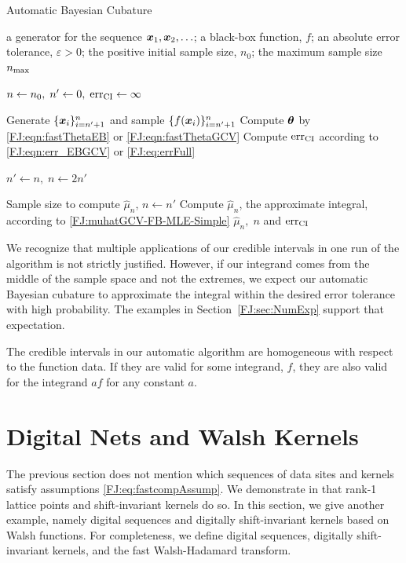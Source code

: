 \documentclass[graybox,footinfo]{svmult}
\begin{document}
\begin{algorithm}
	\caption{Automatic Bayesian Cubature}\label{FJ:algorithm1}
	\begin{algorithmic}[1]
		\Require a generator for the sequence
		${\boldsymbol{x}}_1, {\boldsymbol{x}}_2, \ldots$; 
		a black-box function, $f$; 
		an absolute error tolerance,
		$\varepsilon>0$; the positive initial sample size, $n_0$;
		the maximum sample size $n_{\textup{max}}$
		
		\State $n \gets n_0, \; n' \gets 0, \; \textup{err}_\textup{CI} \gets \infty$
		
		\State Generate $\{ {\boldsymbol{x}}_i\}_{i=n' + 1}^{n}$ and sample $\{f({\boldsymbol{x}}_i)\}_{i=n'+1}^{n}$
		\State Compute ${\boldsymbol{\theta}}$ by \eqref{FJ:eqn:fastThetaEB} or \eqref{FJ:eqn:fastThetaGCV}
		\State Compute $\textup{err}_\textup{CI}$  according to \eqref{FJ:eqn:err_EBGCV} or \eqref{FJ:eq:errFull}
		
		\State	$n' \gets n, \; n \gets 2n'$
		
		\EndWhile
		
		\State Sample size to compute $\widehat{\mu}_n$, $n \gets n'$
		\State Compute $\widehat{\mu}_n$, the approximate integral, according to \eqref{FJ:muhatGCV-FB-MLE-Simple}
		\State \Return $\widehat{\mu}_n, \; n$  and $\textup{err}_\textup{CI}$
	\end{algorithmic}
\end{algorithm}

We recognize that multiple applications of our credible intervals in one run of the algorithm is not strictly justified.  However, if our integrand comes from the middle of the sample space  and not the extremes, we expect our automatic Bayesian cubature to approximate the integral within the desired error tolerance with high probability. The examples in Section~\ref{FJ:sec:NumExp} support that expectation. 

The credible intervals in our automatic algorithm are homogeneous with respect to the function data.  If they are valid for some integrand, $f$, they are also valid for the integrand $a f$ for any constant $a$.  





\section{Digital Nets and Walsh Kernels}
\label{FJ:sec:sobol_walsh}


The previous section does not mention which sequences of data sites and  kernels satisfy assumptions \eqref{FJ:eq:fastcompAssump}.  We demonstrate in \cite{RatHic19a} that rank-1 lattice points and shift-invariant kernels do so.  In this section, we give another example, namely digital sequences and digitally shift-invariant kernels based on Walsh functions.  For completeness, we define digital sequences, digitally shift-invariant kernels, and the fast Walsh-Hadamard transform.
\end{document}
